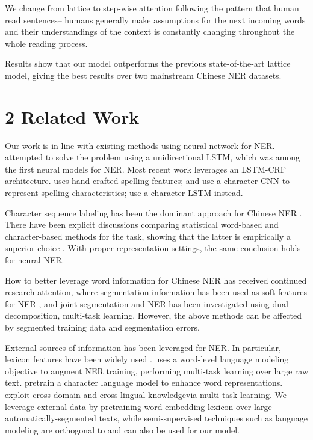 \documentclass[letterpaper]{article} %
\begin{document}
We change from lattice to step-wise attention following the pattern that human read sentences-- humans generally make assumptions for the next incoming words and their understandings of the context is constantly changing throughout the whole reading process. 

Results show that our model outperforms the previous state-of-the-art lattice model, giving the best results over two mainstream Chinese NER datasets.




\section{2  Related Work}
Our work is in line with existing methods using neural network for NER. \cite{hammerton} attempted to solve the problem using a unidirectional LSTM, which was among the first neural models for NER. Most recent work leverages an LSTM-CRF architecture. \cite{huang2015} uses hand-crafted spelling features; \cite{ma} and \cite{chiu} use a character CNN to represent spelling characteristics; \cite{lample} use a character LSTM instead. 

Character sequence labeling has been the dominant approach for Chinese NER \cite{dong}. There have been explicit discussions comparing statistical word-based and character-based methods for the task, showing that the latter is empirically a superior choice \cite{li2014}. With proper representation settings, the same conclusion holds for neural NER.

How to better leverage word information for Chinese NER has received continued research attention, where segmentation information has been used as soft features for NER \cite{peng2015,he2017}, and joint segmentation and NER has been investigated using dual decomposition\cite{Xu2014JointSA}, multi-task learning\cite{Peng2016ImprovingNE}. However, the above methods can be affected by segmented training data and segmentation errors.

External sources of information has been leveraged for NER. In particular, lexicon features have been widely used \cite{Collobert2011NaturalLP,huang2015,Luo2015JointER}. \cite{Rei2017SemisupervisedML} uses a word-level language modeling objective to augment NER training, performing multi-task learning over large raw text. \cite{Peters2017SemisupervisedST} pretrain a character language model to enhance word representations. \cite{Yang2017NeuralWS}  exploit cross-domain and cross-lingual knowledgevia multi-task learning. We leverage external data by pretraining word embedding lexicon over large automatically-segmented texts, while semi-supervised techniques such as language modeling are orthogonal to and can also be used for our model.
\end{document}
